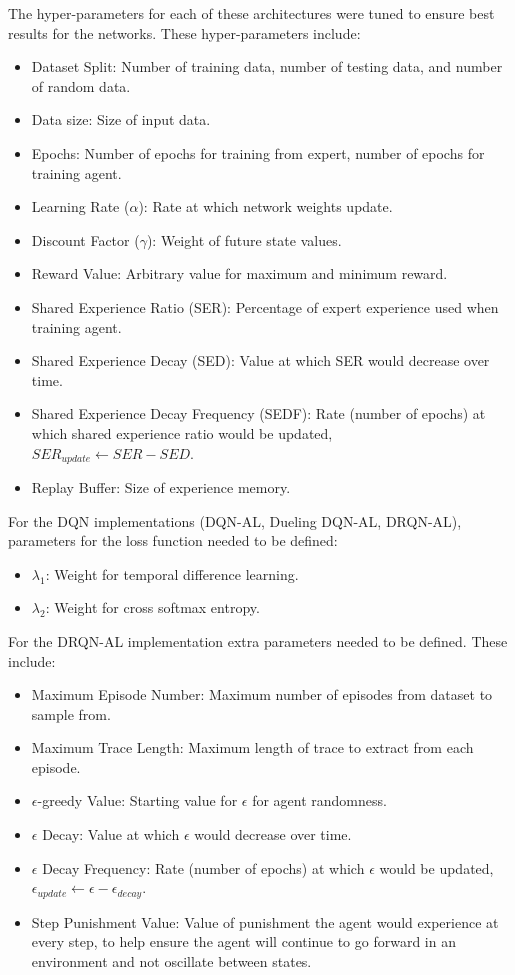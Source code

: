\documentclass[12pt,american]{report}
\begin{document}
The hyper-parameters for each of these architectures were tuned to ensure best results for the networks.  These hyper-parameters include:
\begin{itemize}
  \item Dataset Split: Number of training data, number of testing data, and number of random data.
  \item Data size: Size of input data.
  \item Epochs: Number of epochs for training from expert, number of epochs for training agent.
  \item Learning Rate ($\alpha$): Rate at which network weights update.
  \item Discount Factor ($\gamma$): Weight of future state values.
  \item Reward Value: Arbitrary value for maximum and minimum reward.
  \item Shared Experience Ratio (SER): Percentage of expert experience used when training agent.
  \item Shared Experience Decay (SED): Value at which SER would decrease over time.
  \item Shared Experience Decay Frequency (SEDF): Rate (number of epochs) at which shared experience ratio would be updated, \\$SER_{update} \leftarrow SER - SED$.
  \item Replay Buffer: Size of experience memory.
\end{itemize}
For the DQN implementations (DQN-AL, Dueling DQN-AL, DRQN-AL), parameters for the loss function needed to be defined:
\begin{itemize}
	\item $\lambda_{1}$: Weight for temporal difference learning.
	\item $\lambda_{2}$: Weight for cross softmax entropy.
\end{itemize}
For the DRQN-AL implementation extra parameters needed to be defined.  These include:
\begin{itemize}
	\item Maximum Episode Number: Maximum number of episodes from dataset to sample from.
	\item Maximum Trace Length: Maximum length of trace to extract from each episode.
	\item $\epsilon$-greedy Value: Starting value for $\epsilon$ for agent randomness.
	\item $\epsilon$ Decay: Value at which $\epsilon$ would decrease over time.
	\item $\epsilon$ Decay Frequency: Rate (number of epochs) at which $\epsilon$ would be updated,\\ $\epsilon_{update} \leftarrow \epsilon - \epsilon_{decay}$.
	\item Step Punishment Value: Value of punishment the agent would experience at every step, to help ensure the agent will continue to go forward in an environment and not oscillate between states.
\end{itemize}
\end{document}
